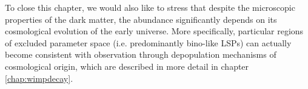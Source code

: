 To close this chapter, we would also like to stress that despite the microscopic properties of the dark matter, the abundance significantly depends on its cosmological evolution of the early universe. More specifically, particular regions of excluded parameter space (i.e. predominantly bino-like LSPs) can actually become consistent with observation through depopulation mechanisms of cosmological origin, which are described in more detail in chapter \ref{chap:wimpdecay}.
